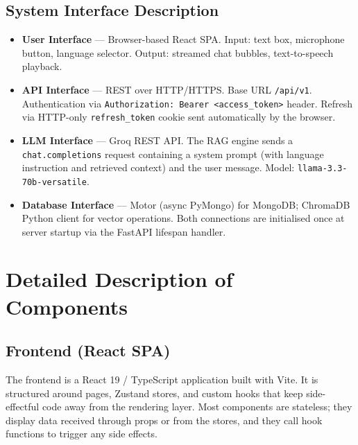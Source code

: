 \subsection{System Interface Description}

\begin{itemize}
  \item \textbf{User Interface} — Browser-based React SPA. Input: text box, microphone
        button, language selector. Output: streamed chat bubbles, text-to-speech playback.

  \item \textbf{API Interface} — REST over HTTP/HTTPS. Base URL
        \texttt{/api/v1}. Authentication via \texttt{Authorization: Bearer <access\_token>}
        header. Refresh via HTTP-only \texttt{refresh\_token} cookie sent automatically
        by the browser.

  \item \textbf{LLM Interface} — Groq REST API. The RAG engine sends a
        \texttt{chat.completions} request containing a system prompt (with language
        instruction and retrieved context) and the user message. Model:
        \texttt{llama-3.3-70b-versatile}.

  \item \textbf{Database Interface} — Motor (async PyMongo) for MongoDB;
        ChromaDB Python client for vector operations. Both connections are initialised
        once at server startup via the FastAPI lifespan handler.
\end{itemize}

\section{Detailed Description of Components}
\label{sec:components}

\subsection{Frontend (React SPA)}
\label{sec:frontend}

The frontend is a React 19 / TypeScript application built with Vite. It is structured
around pages, Zustand stores, and custom hooks that keep side-effectful code away from
the rendering layer. Most components are stateless; they display data received through
props or from the stores, and they call hook functions to trigger any side effects.

